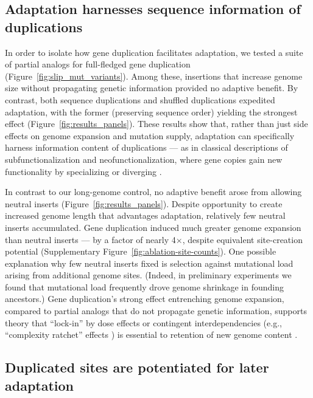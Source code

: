 \subsection{Adaptation harnesses sequence information of duplications}

In order to isolate how gene duplication facilitates adaptation, we tested a suite of partial analogs for full-fledged gene duplication (Figure~\ref{fig:slip_mut_variants}).
Among these, insertions that increase genome size without propagating genetic information provided no adaptive benefit.
By contrast, both sequence duplications and shuffled duplications expedited adaptation, with the former (preserving sequence order) yielding the strongest effect (Figure~\ref{fig:results_panels}).
These results show that, rather than just side effects on genome expansion and mutation supply, adaptation can specifically harness information content of duplications --- as in classical descriptions of subfunctionalization and neofunctionalization, where gene copies gain new functionality by specializing or diverging \citep{ohno1970evolution,Lynch2000}.

In contrast to our long-genome control, no adaptive benefit arose from allowing neutral inserts (Figure~\ref{fig:results_panels}).
Despite opportunity to create increased genome length that advantages adaptation, relatively few neutral inserts accumulated.
Gene duplication induced much greater genome expansion than neutral inserts --- by a factor of nearly 4$\times$, despite equivalent site-creation potential (Supplementary Figure~\ref{fig:ablation-site-counts}).
One possible explanation why few neutral inserts fixed is selection against mutational load arising from additional genome sites.
(Indeed, in preliminary experiments we found that mutational load frequently drove genome shrinkage in founding ancestors.)
Gene duplication's strong effect entrenching genome expansion, compared to partial analogs that do not propagate genetic information, supports theory that ``lock-in'' by dose effects or contingent interdependencies (e.g., ``complexity ratchet'' effects \citep{Liard2020,Soyer2006,Luke2011,gould1996full}) is essential to retention of new genome content \citep{Innan2010,Wagner1998,Tautz1992,Force1999,Bergthorsson2007,Conant2008,Francino2005}.

\subsection{Duplicated sites are potentiated for later adaptation}

